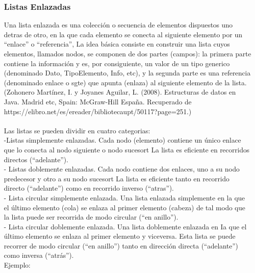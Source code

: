 \documentclass{article}
\begin{document}
\subsubsection{Listas Enlazadas}
Una lista enlazada es una colección o secuencia de elementos dispuestos uno detras de otro, en la que cada elemento se conecta al siguiente elemento por un “enlace” o “referencia”, La idea básica consiste en construir una lista cuyos elementos, llamados nodos, se componen de dos partes (campos): la primera parte contiene la información y es, por consiguiente, un valor de un tipo generico (denominado Dato, TipoElemento, Info, etc), y la segunda parte es una referencia (denominado enlace o sgte) que apunta (enlaza) al siguiente elemento de la lista. (Zohonero Martínez, I. y Joyanes Aguilar, L. (2008). Estructuras de datos en Java. Madrid etc, Spain: McGraw-Hill España. Recuperado de https://elibro.net/es/ereader/bibliotecaupt/50117?page=251.)\\\\Las listas se pueden dividir en cuatro categorias:\\-Listas simplemente enlazadas. Cada nodo (elemento) contiene un único enlace que lo conecta al nodo siguiente o nodo sucesort La lista es eficiente en recorridos directos (“adelante”).\\- Listas doblemente enlazadas. Cada nodo contiene dos enlaces, uno a su nodo predecesor y otro a su nodo sucesort La lista es eficiente tanto en recorrido directo (“adelante”) como en recorrido inverso (“atras”).\\- Lista circular simplemente enlazada. Una lista enlazada simplemente en la que el último elemento (cola) se enlaza al primer elemento (cabeza) de tal modo que la lista puede ser recorrida de modo circular (“en anillo”).\\- Lista circular doblemente enlazada. Una lista doblemente enlazada en Ia que el último elemento se enlaza al primer elemento y viceversa. Esta lista se puede recorrer de modo circular (“en anillo”) tanto en dirección directa (“adelante”) como inversa (“atrás”).\\Ejemplo:
\end{document}
